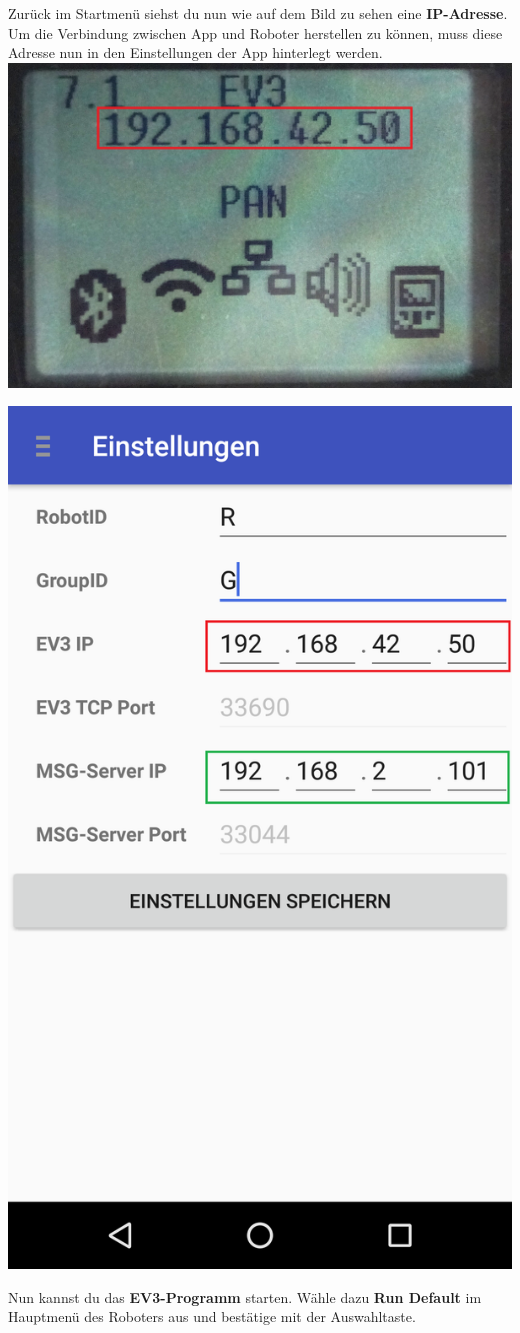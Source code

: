 \documentclass[
	12pt,
	article,
	type=bsc, %
	colorbacktitle,
	instlogo,
	accentcolor=tud1c,
	german,
	twoside
]{tudexercise}
\begin{document}
\begin{enumerate}
\begin{minipage}{.45\textwidth}
\item Zurück im Startmenü siehst du nun wie auf dem Bild zu sehen eine \textbf{IP-Adresse}. Um die Verbindung zwischen App und Roboter herstellen zu können, muss diese Adresse nun in den Einstellungen der App hinterlegt werden. 
\includegraphics[width=.8\textwidth]{img/IP.png}
\end{minipage}
\hspace{.05\textwidth}
\begin{minipage}{.45\textwidth}
\includegraphics[width=.8\textwidth]{img/screenshots/settings.png}
\end{minipage}
\item Nun kannst du das \textbf{EV3-Programm }starten. Wähle dazu \textbf{Run Default} im Hauptmenü des Roboters aus und bestätige mit der Auswahltaste.


\end{enumerate}
\end{document}
